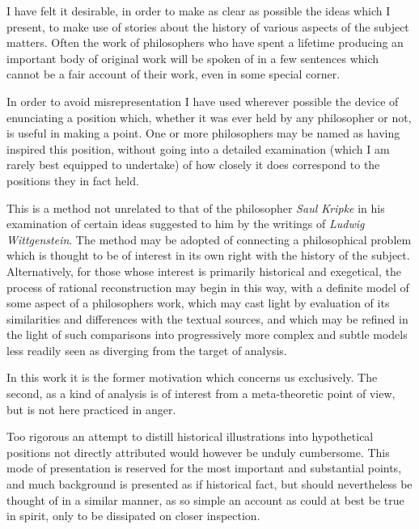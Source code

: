 I have felt it desirable, in order to make as clear as possible the
ideas which I present, to make use of stories about the history of
various aspects of the subject matters.
Often the work of philosophers who have spent a lifetime producing an
important body of original work will be spoken of in a few sentences
which cannot be a fair account of their work, even in some special
corner.

In order to avoid misrepresentation I have used wherever possible the
device of enunciating a position which, whether it was ever held by
any philosopher or not, is useful in making a point.
One or more philosophers may be named as having inspired this
position, without going into a detailed examination (which I am
rarely best equipped to undertake) of how closely it does correspond to
the positions they in fact held.

This is a method not unrelated to that of the philosopher {\it Saul
  Kripke} in his examination of certain ideas suggested to him by the
writings of {\it Ludwig Wittgenstein}.
The method may be adopted of connecting a philosophical problem which
is thought to be of interest in its own right with the history of the
subject.
Alternatively, for those whose interest is primarily historical and
exegetical, the process of rational reconstruction may begin in this
way, with a definite model of some aspect of a philosophers work,
which may cast light by evaluation of its similarities and differences
with the textual sources, and which may be refined in the light of
such comparisons into progressively more complex and subtle models
less readily seen as diverging from the target of analysis.

In this work it is the former motivation which concerns us
exclusively.
The second, as a kind of analysis is of interest from a meta-theoretic
point of view, but is not here practiced in anger. 

Too rigorous an attempt to distill historical illustrations into
hypothetical positions not directly attributed would however be unduly
cumbersome.
This mode of presentation is reserved for the most important and
substantial points, and much background is presented as if historical
fact, but should nevertheless be thought of in a similar manner, as so
simple an account as could at best be true in spirit, only to be
dissipated on closer inspection.
